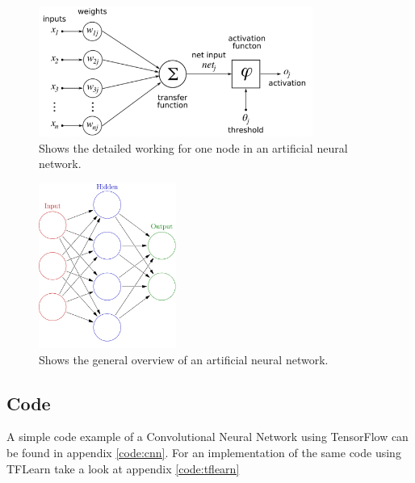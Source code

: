 \begin{figure}
\centering
\includegraphics[width=0.8\textwidth]{images/nn_detail.png}
\caption{\label{fig:nnd} Shows the detailed working for one node in an artificial neural network.}
\end{figure}

\begin{figure}
\centering
\includegraphics[width=0.4\textwidth]{images/nn_overview.png}
\caption{\label{fig:nno} Shows the general overview of an artificial neural network.}
\end{figure}

\subsection{Code}
A simple code example of a Convolutional Neural Network using TensorFlow can be found in appendix \ref{code:cnn}. For an implementation of the same code using TFLearn take a look at appendix \ref{code:tflearn}